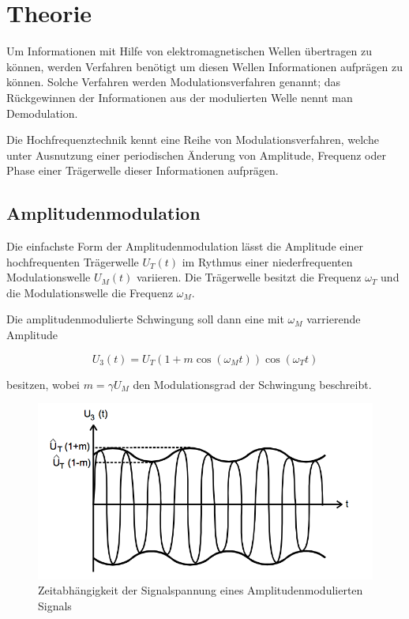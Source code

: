 \section{Theorie}
Um Informationen mit Hilfe von elektromagnetischen Wellen übertragen zu können, werden Verfahren benötigt um diesen Wellen Informationen aufprägen zu können. Solche Verfahren werden Modulationsverfahren genannt; das Rückgewinnen der Informationen aus der modulierten Welle nennt man Demodulation.

Die Hochfrequenztechnik kennt eine Reihe von Modulationsverfahren, welche unter Ausnutzung einer periodischen Änderung von Amplitude, Frequenz oder Phase einer Trägerwelle dieser Informationen aufprägen.

\subsection{Amplitudenmodulation}
Die einfachste Form der Amplitudenmodulation lässt die Amplitude einer hochfrequenten Trägerwelle $U_T(t)$ im Rythmus einer niederfrequenten Modulationswelle $U_M(t)$ variieren. Die Trägerwelle besitzt die Frequenz $\omega_T$ und die Modulationswelle die
Frequenz $\omega_M$.

Die amplitudenmodulierte Schwingung soll dann eine mit $\omega_M$ varrierende Amplitude

\begin{equation}
U_{3}(t) = U_T (1 + m \cos( \omega_M t))\cos(\omega_T t)
\label{eq:AmMod}
\end{equation} 

besitzen, wobei $m = \gamma U_M$ den  Modulationsgrad der Schwingung beschreibt.

\begin{figure}
	\centering
	\includegraphics[width=\textwidth]{img/Abb1.png}
	\caption{Zeitabhängigkeit der Signalspannung eines Amplitudenmodulierten Signals \cite{FP}}
\end{figure}

